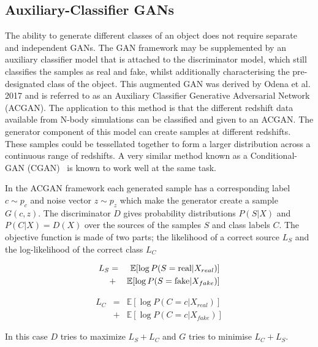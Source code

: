 \documentclass[twocolumn]{article}
\newcommand\EE{\mathbb{E}}
\numberwithin{equation}{section}
\begin{document}
\subsection{Auxiliary-Classifier GANs}
The ability to generate different classes of an object does not require separate and independent GANs. The GAN framework 
may be supplemented by an auxiliary classifier model that is attached to the discriminator model, which still classifies 
the samples as real and fake, whilst additionally characterising the pre-designated class of the object. This augmented 
GAN was derived by Odena et al. 2017 \cite{acgan} and is referred to as an Auxiliary Classifier Generative Adversarial 
Network (ACGAN). The application to this method is that the different redshift data available from N-body simulations can 
be classified and given to an ACGAN. The generator component of this model can create samples at different redshifts. 
These samples could be tessellated together to form a larger distribution across a continuous range of  redshifts. A very 
similar method known as a Conditional-GAN (CGAN)~\cite{cgan} is known to work well at the same task.

In the ACGAN framework each generated sample has a corresponding label $c \sim p_c$ and noise vector $z \sim p_z$ which 
make the generator create a sample $G(c, z)$. The discriminator $D$ gives probability distributions $P(S|X)$ and $P(C|X) 
= D(X)$ over the sources of the samples $S$ and class labels $C$. The objective function is made of two parts; the 
likelihood of a correct source $L_S$ and the log-likelihood of the correct class $L_C$

\begin{eqnarray}
    L_S &=& \EE [\log P(S = \textup{real} | X_{real})] \nonumber \\
        &+& \EE [\log P(S = \textup{fake} | X_{fake})]
\end{eqnarray}

\begin{eqnarray}
    L_C &=& \EE [\log P(C = c | X_{real})] \nonumber \\
        &+& \EE [\log P(C = c | X_{fake})]
\end{eqnarray}

In this case $D$ tries to maximize $L_S + L_C$ and $G$ tries to minimise $L_C + L_S$.

\end{document}
